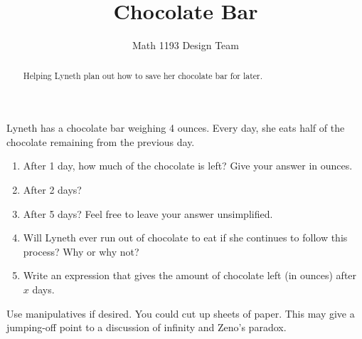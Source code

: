 \documentclass[noauthor]{ximera}
\title{Chocolate Bar}
\author{Math 1193 Design Team}
\begin{document}
\begin{abstract}
    Helping Lyneth plan out how to save her chocolate bar for later.
\end{abstract}
\maketitle

Lyneth has a chocolate bar weighing 4 ounces. Every day, 
she eats half of the chocolate remaining from the previous day.

\begin{enumerate}
    \item After 1 day, how much of the chocolate is left? 
    Give your answer in ounces.
    \item After 2 days?
    \item After 5 days? Feel free to leave your answer unsimplified.
    \item Will Lyneth ever run out of chocolate to eat if she
    continues to follow this process? Why or why not?
    \item Write an expression that gives the amount of chocolate left
    (in ounces) after \(x\) days.
\end{enumerate}

\begin{instructorNotes}
Use manipulatives if desired. You could cut up sheets of paper. This may
give a jumping-off point to a discussion of infinity and Zeno's paradox.
\end{instructorNotes}
\end{document}
